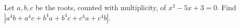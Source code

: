 Let $a,b,c$ be the roots, counted with multiplicity, of $x^3-5x+3=0$. Find $\left|a^4b+a^4c+b^4a+b^4c+c^4a+c^4b\right|$.
